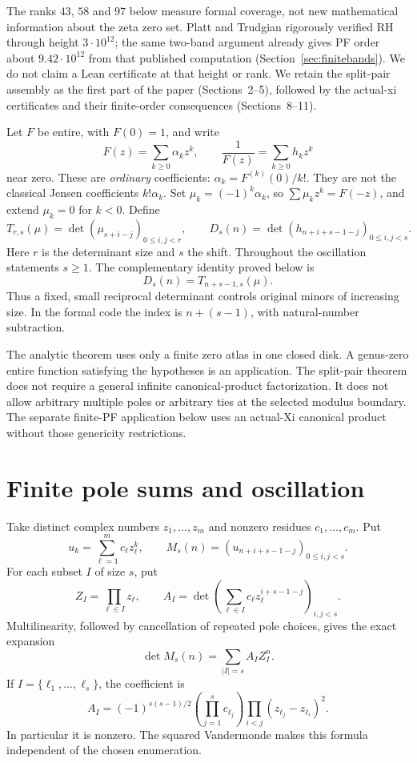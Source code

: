 \documentclass[11pt]{amsart}
\begin{document}
The ranks $43$, $58$ and $97$ below measure formal coverage, not new
mathematical information about the zeta zero set. Platt and Trudgian
\cite{platttrudgian} rigorously verified RH through height $3\cdot10^{12}$;
the same two-band argument already gives PF order about $9.42\cdot10^{12}$
from that published computation (Section~\ref{sec:finitebands}). We do not
claim a Lean certificate at that height or rank. We retain the split-pair
assembly as the first part of the paper (Sections~2--5), followed by the
actual-xi certificates and their finite-order consequences (Sections~8--11).

Let $F$ be entire, with $F(0)=1$, and write
\[
 F(z)=\sum_{k\ge0}\alpha_k z^k,\qquad
 \frac1{F(z)}=\sum_{k\ge0}h_k z^k
\]
near zero. These are \emph{ordinary} coefficients:
$\alpha_k=F^{(k)}(0)/k!$. They are not the classical Jensen coefficients $k!\alpha_k$.
Set $\mu_k=(-1)^k\alpha_k$, so $\sum\mu_kz^k=F(-z)$, and extend $\mu_k=0$ for $k<0$. Define
\[
 T_{r,s}(\mu)=\det(\mu_{s+i-j})_{0\le i,j<r},\qquad
 D_s(n)=\det(h_{n+i+s-1-j})_{0\le i,j<s}.
\]
Here $r$ is the determinant size and $s$ the shift. Throughout the oscillation statements $s\ge1$. The complementary identity proved below is
\begin{equation}\label{eq:jacobi}
 D_s(n)=T_{n+s-1,s}(\mu).
\end{equation}
Thus a fixed, small reciprocal determinant controls original minors of increasing size. In the formal code the index is $n+(s-1)$, with natural-number subtraction.

The analytic theorem uses only a finite zero atlas in one closed disk. A genus-zero entire function satisfying the hypotheses is an application. The split-pair theorem does not require a general infinite canonical-product factorization. It does not allow arbitrary multiple poles or arbitrary ties at the selected modulus boundary. The separate finite-PF application below uses an actual-Xi canonical product without those genericity restrictions.

\section{Finite pole sums and oscillation}
Take distinct complex numbers $z_1,\ldots,z_m$ and nonzero residues $c_1,\ldots,c_m$. Put
\[
 u_k=\sum_{\ell=1}^m c_\ell z_\ell^k,\qquad
 M_s(n)=(u_{n+i+s-1-j})_{0\le i,j<s}.
\]
For each subset $I$ of size $s$, put
\[
 Z_I=\prod_{\ell\in I}z_\ell,\qquad
 A_I=\det\left(\sum_{\ell\in I}c_\ell z_\ell^{i+s-1-j}\right)_{i,j<s}.
\]
Multilinearity, followed by cancellation of repeated pole choices, gives the exact expansion
\begin{equation}\label{eq:subset}
 \det M_s(n)=\sum_{|I|=s} A_I Z_I^n.
\end{equation}
If $I=\{\ell_1,\ldots,\ell_s\}$, the coefficient is
\begin{equation}\label{eq:leading}
 A_I=(-1)^{s(s-1)/2}
       \left(\prod_{j=1}^s c_{\ell_j}\right)
       \prod_{i<j}(z_{\ell_j}-z_{\ell_i})^2.
\end{equation}
In particular it is nonzero. The squared Vandermonde makes this formula independent of the chosen enumeration.
\end{document}
